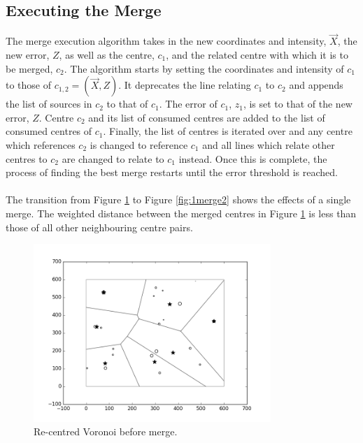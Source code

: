 \subsection{Executing the Merge}
The merge execution algorithm takes in the new coordinates and intensity, $\vec{X}$, the new error, $Z$, as well as the centre, $c_1$, and the related centre with which it is to be merged, $c_2$. The algorithm starts by setting the coordinates and intensity of $c_1$ to those of $c_{1,2} = (\vec{X},Z)$. It deprecates the line relating $c_1$ to $c_2$ and appends the list of sources in $c_2$ to that of $c_1$. The error of $c_1$, $z_1$, is set to that of the new error, $Z$. Centre $c_2$ and its list of consumed centres are added to the list of consumed centres of $c_1$. Finally, the list of centres is iterated over and any centre which references $c_2$ is changed to reference $c_1$ and all lines which relate other centres to $c_2$ are changed to relate to $c_1$ instead. Once this is complete, the process of finding the best merge restarts until the error threshold is reached.
\\
\\
The transition from Figure \ref{fig:1merge1} to Figure \ref{fig:1merge2} shows the effects of a single merge. The weighted distance between the merged centres in Figure \ref{fig:1merge1} is less than those of all other neighbouring centre pairs.
\begin{figure}[H]
  \centering
  \includegraphics[width=0.8\textwidth]{Images/1merge1.png}
  \caption{Re-centred Voronoi before merge.}
  \label{fig:1merge1}
\end{figure}
